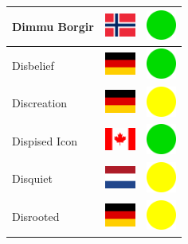 \documentclass[12pt, a4paper, twoside]{report}
\begin{document}
\begin{center}
\begin{longtable}{|p{5cm}|p{2cm}|p{2cm}|}
 Dimmu Borgir                                               & \includegraphics[width=1cm]{../4x3/no} &   \includegraphics[width=1cm]{../likes/y} \\ \hline
 Disbelief                                                  & \includegraphics[width=1cm]{../4x3/de} &   \includegraphics[width=1cm]{../likes/y} \\ \hline
 Discreation                                                & \includegraphics[width=1cm]{../4x3/de} &   \includegraphics[width=1cm]{../likes/m} \\ \hline
 Dispised Icon                                              & \includegraphics[width=1cm]{../4x3/ca} &   \includegraphics[width=1cm]{../likes/y} \\ \hline
 Disquiet                                                   & \includegraphics[width=1cm]{../4x3/nl} &   \includegraphics[width=1cm]{../likes/m} \\ \hline
 Disrooted                                                  & \includegraphics[width=1cm]{../4x3/de} &   \includegraphics[width=1cm]{../likes/m} \\ \hline

\end{longtable}
\end{center}
\end{document}
